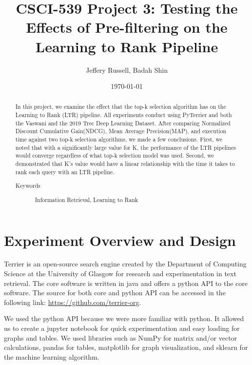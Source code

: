 \documentclass[letterpaper,12pt]{article}
\begin{document}
\title{CSCI-539 Project 3: Testing the Effects of Pre-filtering on the Learning to Rank Pipeline}
\author{Jeffery Russell, Badah Shin}

\date{\today}
\maketitle

\begin{abstract}
In this project, we examine the effect that the top-k selection algorithm has on the Learning to Rank (LTR) pipeline.
All experiments conduct using PyTerrier and both the Vaswani and the 2019 Trec Deep Learning Dataset.
After comparing Normalized Discount Cumulative Gain(NDCG), Mean Average Precision(MAP), and execution time against two top-k selection algorithms, we made a few conclusions. First, we noted that with a significantly large value for K, the performance of the LTR pipelines would converge regardless of what top-k selection model was used. Second, we demonstrated that K's value would have a linear relationship with the time it takes to rank each query with an LTR pipeline.

\begin{description}
\item[Keywords]
Information Retrieval, Learning to Rank
\end{description}

\end{abstract}
\maketitle

\section{Experiment Overview and Design}

Terrier is an open-source search engine created by the Department of Computing Science at the University of Glasgow for research and experimentation in text retrieval. The core software is written in java and offers a python API to the core software. The source for both core and python API can be accessed in the following link: \url{https://github.com/terrier-org}.

We used the python API because we were more familiar with python. It allowed us to create a jupyter notebook for quick experimentation and easy loading for graphs and tables.
We used libraries such as NumPy for matrix and/or vector calculations, pandas for tables, matplotlib for graph visualization, and sklearn for the machine learning algorithm. 
\end{document}

